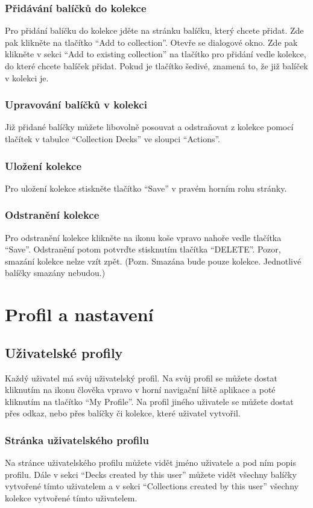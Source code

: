 \documentclass[a4paper,12pt]{article}
\begin{document}
\subsubsection*{Přidávání balíčků do kolekce}
Pro přidání balíčku do kolekce jděte na stránku balíčku, který chcete přidat. Zde pak klikněte na tlačítko \enquote{Add to collection}. Otevře se dialogové okno. Zde pak klikněte v sekci \enquote{Add to existing collection} na tlačítko pro přidání vedle kolekce, do které chcete balíček přidat. Pokud je tlačítko šedivé, znamená to, že již balíček v kolekci je.
\subsubsection*{Upravování balíčků v kolekci}
Již přidané balíčky můžete libovolně posouvat a odstraňovat z kolekce pomocí tlačítek v tabulce \enquote{Collection Decks} ve sloupci \enquote{Actions}.
\subsubsection*{Uložení kolekce}
Pro uložení kolekce stiskněte tlačítko \enquote{Save} v pravém horním rohu stránky.
\subsubsection*{Odstranění kolekce}
Pro odstranění kolekce klikněte na ikonu koše vpravo nahoře vedle tlačítka \enquote{Save}. Odstranění potom potvrďte stisknutím tlačítka \enquote{DELETE}. Pozor, smazání kolekce nelze vzít zpět. (Pozn. Smazána bude pouze kolekce. Jednotlivé balíčky smazány nebudou.)

\section{Profil a nastavení}
\subsection{Uživatelské profily}
Každý uživatel má svůj uživatelský profil. Na svůj profil se můžete dostat kliknutím na ikonu člověka vpravo v horní navigační liště aplikace a poté kliknutím na tlačítko \enquote{My Profile}. Na profil jiného uživatele se můžete dostat přes odkaz, nebo přes balíčky či kolekce, které uživatel vytvořil.

\subsubsection*{Stránka uživatelského profilu}
Na stránce uživatelského profilu můžete vidět jméno uživatele a pod ním popis profilu. Dále v sekci \enquote{Decks created by this user} můžete vidět všechny balíčky vytvořené tímto uživatelem a v sekci \enquote{Collections created by this user} všechny kolekce vytvořené tímto uživatelem.
\end{document}
